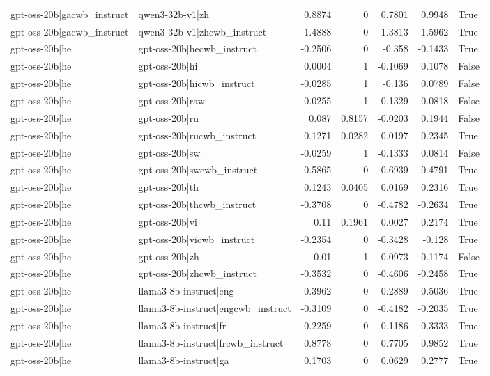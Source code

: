 \begin{table}
\begin{tabular}{l l r r r r l}
gpt-oss-20b|gacwb_instruct & qwen3-32b-v1|zh & 0.8874 & 0 & 0.7801 & 0.9948 & True \\
gpt-oss-20b|gacwb_instruct & qwen3-32b-v1|zhcwb_instruct & 1.4888 & 0 & 1.3813 & 1.5962 & True \\
gpt-oss-20b|he & gpt-oss-20b|hecwb_instruct & -0.2506 & 0 & -0.358 & -0.1433 & True \\
gpt-oss-20b|he & gpt-oss-20b|hi & 0.0004 & 1 & -0.1069 & 0.1078 & False \\
gpt-oss-20b|he & gpt-oss-20b|hicwb_instruct & -0.0285 & 1 & -0.136 & 0.0789 & False \\
gpt-oss-20b|he & gpt-oss-20b|raw & -0.0255 & 1 & -0.1329 & 0.0818 & False \\
gpt-oss-20b|he & gpt-oss-20b|ru & 0.087 & 0.8157 & -0.0203 & 0.1944 & False \\
gpt-oss-20b|he & gpt-oss-20b|rucwb_instruct & 0.1271 & 0.0282 & 0.0197 & 0.2345 & True \\
gpt-oss-20b|he & gpt-oss-20b|sw & -0.0259 & 1 & -0.1333 & 0.0814 & False \\
gpt-oss-20b|he & gpt-oss-20b|swcwb_instruct & -0.5865 & 0 & -0.6939 & -0.4791 & True \\
gpt-oss-20b|he & gpt-oss-20b|th & 0.1243 & 0.0405 & 0.0169 & 0.2316 & True \\
gpt-oss-20b|he & gpt-oss-20b|thcwb_instruct & -0.3708 & 0 & -0.4782 & -0.2634 & True \\
gpt-oss-20b|he & gpt-oss-20b|vi & 0.11 & 0.1961 & 0.0027 & 0.2174 & True \\
gpt-oss-20b|he & gpt-oss-20b|vicwb_instruct & -0.2354 & 0 & -0.3428 & -0.128 & True \\
gpt-oss-20b|he & gpt-oss-20b|zh & 0.01 & 1 & -0.0973 & 0.1174 & False \\
gpt-oss-20b|he & gpt-oss-20b|zhcwb_instruct & -0.3532 & 0 & -0.4606 & -0.2458 & True \\
gpt-oss-20b|he & llama3-8b-instruct|eng & 0.3962 & 0 & 0.2889 & 0.5036 & True \\
gpt-oss-20b|he & llama3-8b-instruct|engcwb_instruct & -0.3109 & 0 & -0.4182 & -0.2035 & True \\
gpt-oss-20b|he & llama3-8b-instruct|fr & 0.2259 & 0 & 0.1186 & 0.3333 & True \\
gpt-oss-20b|he & llama3-8b-instruct|frcwb_instruct & 0.8778 & 0 & 0.7705 & 0.9852 & True \\
gpt-oss-20b|he & llama3-8b-instruct|ga & 0.1703 & 0 & 0.0629 & 0.2777 & True \\

\end{tabular}
\end{table}
